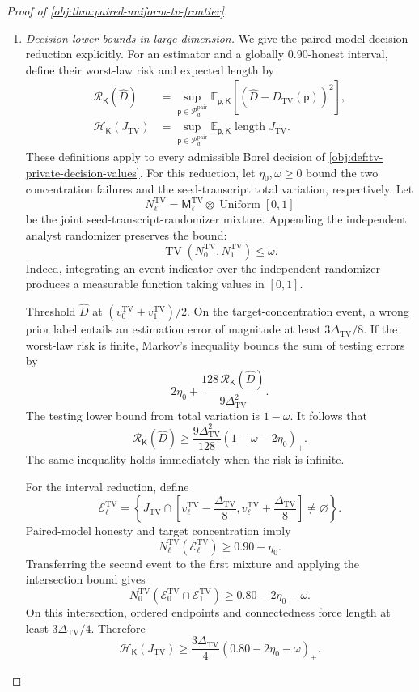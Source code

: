 \begin{proof}[Proof of \cref{obj:thm:paired-uniform-tv-frontier}]
\begin{enumerate}
\item \textit{Decision lower bounds in large dimension.}
We give the paired-model decision reduction explicitly.
For an estimator and a globally \(0.90\)-honest interval, define their worst-law risk and expected length by
\[
\begin{aligned}
\mathcal R_{\mathsf K}(\widehat D)
&=\sup_{\mathsf p\in\mathcal P_d^{\mathrm{pair}}}
\mathbb E_{\mathsf p,\mathsf K}
\left[(\widehat D-D_{\mathrm{TV}}(\mathsf p))^2\right],\\
\mathcal H_{\mathsf K}(J_{\mathrm{TV}})
&=\sup_{\mathsf p\in\mathcal P_d^{\mathrm{pair}}}
\mathbb E_{\mathsf p,\mathsf K}\operatorname{length}J_{\mathrm{TV}}.
\end{aligned}
\]
These definitions apply to every admissible Borel decision of \cref{obj:def:tv-private-decision-values}.
For this reduction, let \(\eta_0,\omega\ge0\) bound the two concentration failures and the seed-transcript total variation, respectively.
Let
\[
N_\ell^{\mathrm{TV}}
=\mathsf M_\ell^{\mathrm{TV}}\otimes\operatorname{Uniform}[0,1]
\]
be the joint seed-transcript-randomizer mixture.
Appending the independent analyst randomizer preserves the bound:
\[
\operatorname{TV}(N_0^{\mathrm{TV}},N_1^{\mathrm{TV}})\le\omega.
\]
Indeed, integrating an event indicator over the independent randomizer produces a measurable function taking values in \([0,1]\).

Threshold \(\widehat D\) at
\((v_0^{\mathrm{TV}}+v_1^{\mathrm{TV}})/2\).
On the target-concentration event, a wrong prior label entails an estimation error of magnitude at least \(3\Delta_{\mathrm{TV}}/8\).
If the worst-law risk is finite, Markov's inequality bounds the sum of testing errors by
\[
2\eta_0+
\frac{128\,\mathcal R_{\mathsf K}(\widehat D)}
{9\Delta_{\mathrm{TV}}^2}.
\]
The testing lower bound from total variation is \(1-\omega\). It follows that
\[
\mathcal R_{\mathsf K}(\widehat D)
\ge
\frac{9\Delta_{\mathrm{TV}}^2}{128}
(1-\omega-2\eta_0)_+.
\]
The same inequality holds immediately when the risk is infinite.

For the interval reduction, define
\[
\mathcal E_\ell^{\mathrm{TV}}
=
\left\{
J_{\mathrm{TV}}\cap
\left[v_\ell^{\mathrm{TV}}-\frac{\Delta_{\mathrm{TV}}}{8},
      v_\ell^{\mathrm{TV}}+\frac{\Delta_{\mathrm{TV}}}{8}\right]
\ne\varnothing
\right\}.
\]
Paired-model honesty and target concentration imply
\[
N_\ell^{\mathrm{TV}}(\mathcal E_\ell^{\mathrm{TV}})
\ge0.90-\eta_0.
\]
Transferring the second event to the first mixture and applying the intersection bound gives
\[
N_0^{\mathrm{TV}}
(\mathcal E_0^{\mathrm{TV}}\cap\mathcal E_1^{\mathrm{TV}})
\ge0.80-2\eta_0-\omega.
\]
On this intersection, ordered endpoints and connectedness force length at least \(3\Delta_{\mathrm{TV}}/4\). Therefore
\[
\mathcal H_{\mathsf K}(J_{\mathrm{TV}})
\ge
\frac{3\Delta_{\mathrm{TV}}}{4}
(0.80-2\eta_0-\omega)_+.
\]


\end{enumerate}
\end{proof}
